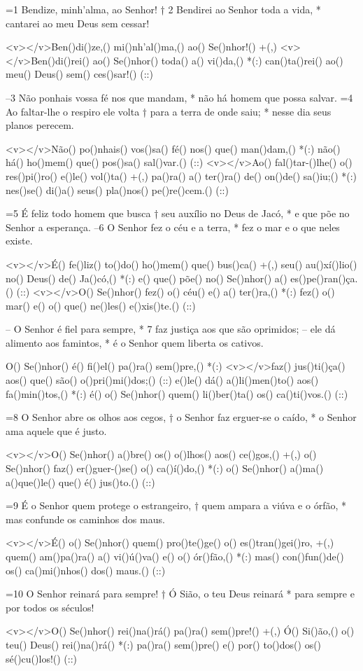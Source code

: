 =1 Bendize, minh'alma, ao Senhor! †
2 Bendirei ao Senhor toda a vida, *
cantarei ao meu Deus sem cessar!

<v></v>Ben()di()ze,() mi()nh'al()ma,() ao() Se()nhor!() +(,)
<v></v>Ben()di()rei() ao() Se()nhor() toda() a() vi()da,() *(:)
can()ta()rei() ao() meu() Deus() sem() ces()sar!() (::)

–3 Não ponhais vossa fé nos que mandam, *
não há homem que possa salvar.
=4 Ao faltar-lhe o respiro ele volta †
para a terra de onde saiu; *
nesse dia seus planos perecem.

<v></v>Não() po()nhais() vos()sa() fé() nos() que() man()dam,() *(:)
não() há() ho()mem() que() pos()sa() sal()var.() (::)
<v></v>Ao() fal()tar-()lhe() o() res()pi()ro() e()le() vol()ta() +(,)
pa()ra() a() ter()ra() de() on()de() sa()iu;() *(:)
nes()se() di()a() seus() pla()nos() pe()re()cem.() (::)

=5 É feliz todo homem que busca †
seu auxílio no Deus de Jacó, *
e que põe no Senhor a esperança.
–6 O Senhor fez o céu e a terra, *
fez o mar e o que neles existe.

<v></v>É() fe()liz() to()do() ho()mem() que() bus()ca() +(,)
seu() au()xí()lio() no() Deus() de() Ja()có,() *(:)
e() que() põe() no() Se()nhor() a() es()pe()ran()ça.() (::)
<v></v>O() Se()nhor() fez() o() céu() e() a() ter()ra,() *(:)
fez() o() mar() e() o() que() ne()les() e()xis()te.() (::)

– O Senhor é fiel para sempre, *
7 faz justiça aos que são oprimidos;
– ele dá alimento aos famintos, *
é o Senhor quem liberta os cativos.

O() Se()nhor() é() fi()el() pa()ra() sem()pre,() *(:)
<v></v>faz() jus()ti()ça() aos() que() são() o()pri()mi()dos;() (::)
e()le() dá() a()li()men()to() aos() fa()min()tos,() *(:)
é() o() Se()nhor() quem() li()ber()ta() os() ca()ti()vos.() (::)

=8 O Senhor abre os olhos aos cegos, †
o Senhor faz erguer-se o caído, *
o Senhor ama aquele que é justo.

<v></v>O() Se()nhor() a()bre() os() o()lhos() aos() ce()gos,() +(,)
o() Se()nhor() faz() er()guer-()se() o() ca()í()do,() *(:)
o() Se()nhor() a()ma() a()que()le() que() é() jus()to.() (::)

=9 É o Senhor quem protege o estrangeiro, †
quem ampara a viúva e o órfão, *
mas confunde os caminhos dos maus.

<v></v>É() o() Se()nhor() quem() pro()te()ge() o() es()tran()gei()ro, +(,)
quem() am()pa()ra() a() vi()ú()va() e() o() ór()fão,() *(:)
mas() con()fun()de() os() ca()mi()nhos() dos() maus.() (::)

=10 O Senhor reinará para sempre! †
Ó Sião, o teu Deus reinará *
para sempre e por todos os séculos!

<v></v>O() Se()nhor() rei()na()rá() pa()ra() sem()pre!() +(,)
Ó() Si()ão,() o() teu() Deus() rei()na()rá() *(:)
pa()ra() sem()pre() e() por() to()dos() os() sé()cu()los!() (::)